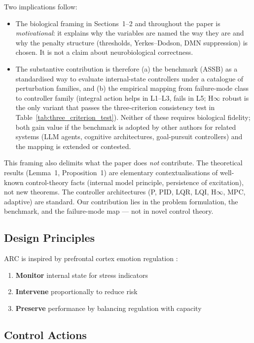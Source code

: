 \documentclass{article}
\begin{document}
Two implications follow:
\begin{itemize}
    \item The biological framing in Sections~1--2 and throughout the paper is \emph{motivational}: it explains why the variables are named the way they are and why the penalty structure (thresholds, Yerkes--Dodson, DMN suppression) is chosen. It is not a claim about neurobiological correctness.
    \item The substantive contribution is therefore (a) the benchmark (ASSB) as a standardised way to evaluate internal-state controllers under a catalogue of perturbation families, and (b) the empirical mapping from failure-mode class to controller family (integral action helps in L1--L3, fails in L5; H$\infty$ robust is the only variant that passes the three-criterion consistency test in Table~\ref{tab:three_criterion_test}). Neither of these requires biological fidelity; both gain value if the benchmark is adopted by other authors for related systems (LLM agents, cognitive architectures, goal-pursuit controllers) and the mapping is extended or contested.
\end{itemize}

This framing also delimits what the paper does \emph{not} contribute. The theoretical results (Lemma~1, Proposition~1) are elementary contextualisations of well-known control-theory facts (internal model principle, persistence of excitation), not new theorems. The controller architectures (P, PID, LQR, LQI, H$\infty$, MPC, adaptive) are standard. Our contribution lies in the problem formulation, the benchmark, and the failure-mode map --- not in novel control theory.

\subsection{Design Principles}

ARC is inspired by prefrontal cortex emotion regulation \cite{Ochsner2005}:
\begin{enumerate}
    \item \textbf{Monitor} internal state for stress indicators
    \item \textbf{Intervene} proportionally to reduce risk
    \item \textbf{Preserve} performance by balancing regulation with capacity
\end{enumerate}

\subsection{Control Actions}
\end{document}
